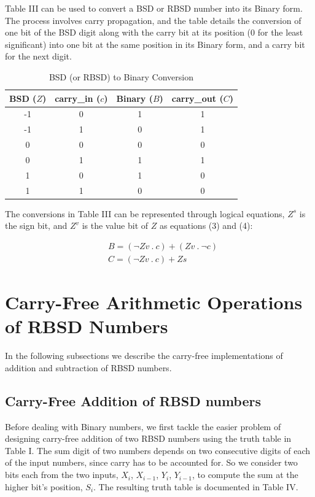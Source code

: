 \documentclass[conference]{IEEEtran_IBSS}
\begin{document}
Table III can be used to convert a BSD or RBSD number into its Binary form. The process involves carry propagation, and the table details the conversion of one bit of the BSD digit along with the carry bit at its position (0 for the least significant) into one bit at the same position in its Binary form, and a carry bit for the next digit.

\vspace{-.5em}
\begin{table}[h!]
  \centering
  \caption{BSD (or RBSD) to Binary Conversion}
  \label{tab:table3}
  \begin{tabular}{|c|c||c|c|}
    \hline
    BSD ($Z$) & carry\_in ($c$) & Binary ($B$) & carry\_out ($C$) \\
    \hline
    \hline
    -1 & 0 & 1 & 1\\
    \hline
    -1 & 1 & 0 & 1\\
    \hline
    0 & 0 & 0 & 0\\
    \hline
    0 & 1 & 1 & 1\\
    \hline
    1 & 0 & 1 & 0\\
    \hline
    1 & 1 & 0 & 0\\
    \hline
  \end{tabular}
\end{table}

The conversions in Table III can be represented through logical equations, $Z^{s}$ is the sign bit, and $Z^{v}$ is the value bit of $Z$ as equations (3) and (4):

\vspace{-1em}
\begin{align}
&B = (\neg Zv \ . \ c) + (Zv \ . \ \neg c) \\
&C = (\neg Zv \ . \ c) + Zs
\end{align}

\section{Carry-Free Arithmetic Operations of RBSD Numbers}

In the following subsections we describe the carry-free implementations of addition and subtraction of RBSD numbers.

\subsection{Carry-Free Addition of RBSD numbers}

Before dealing with Binary numbers, we first tackle the easier problem of designing carry-free addition of two RBSD numbers using the truth table in Table I. The sum digit of two numbers depends on two consecutive digits of each of the input numbers, since carry has to be accounted for. So we consider two bits each from the two inputs, $X_{i}$, $X_{i-1}$, $Y_{i}$, $Y_{i-1}$, to compute the sum at the higher bit’s position, $S_{i}$. The resulting truth table is documented in Table IV.
\end{document}
